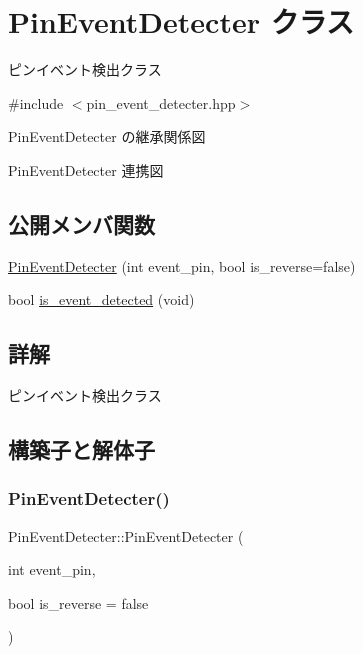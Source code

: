 \hypertarget{class_pin_event_detecter}{}\section{Pin\+Event\+Detecter クラス}
\label{class_pin_event_detecter}


ピンイベント検出クラス  




{\ttfamily \#include $<$pin\+\_\+event\+\_\+detecter.\+hpp$>$}



Pin\+Event\+Detecter の継承関係図


Pin\+Event\+Detecter 連携図
\subsection*{公開メンバ関数}
\begin{DoxyCompactItemize}
\item 
\mbox{\hyperlink{class_pin_event_detecter_aa1d81fff7c1bdbbf0351466d2f5784d5}{Pin\+Event\+Detecter}} (int event\+\_\+pin, bool is\+\_\+reverse=false)
\item 
bool \mbox{\hyperlink{class_pin_event_detecter_a6e65a11e39838c30f58c66dd057abc90}{is\+\_\+event\+\_\+detected}} (void)
\end{DoxyCompactItemize}


\subsection{詳解}
ピンイベント検出クラス 

\subsection{構築子と解体子}
\mbox{\label{class_pin_event_detecter_aa1d81fff7c1bdbbf0351466d2f5784d5}} 
\subsubsection{\texorpdfstring{PinEventDetecter()}{PinEventDetecter()}}
{\footnotesize\ttfamily Pin\+Event\+Detecter\+::\+Pin\+Event\+Detecter (\begin{DoxyParamCaption}\item[{int}]{event\+\_\+pin,  }\item[{bool}]{is\+\_\+reverse = {\ttfamily false} }\end{DoxyParamCaption})\hspace{0.3cm}{\ttfamily [inline]}}



